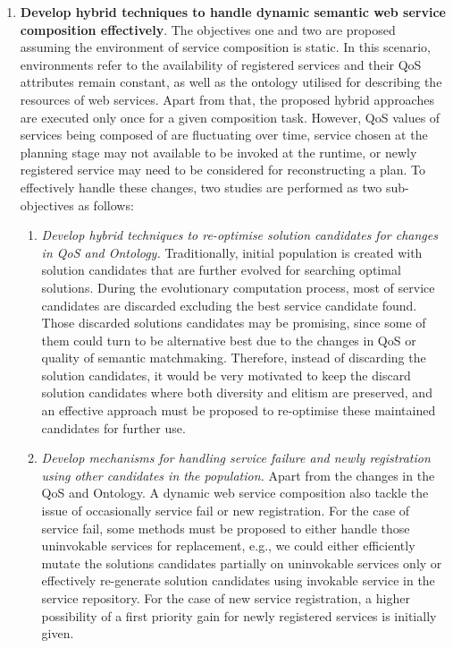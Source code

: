 \begin{enumerate}
 \item \textbf{Develop hybrid techniques to handle dynamic semantic web service composition effectively}. The objectives one and two are proposed assuming the environment of service composition is static. In this scenario, environments refer to the availability of registered services and their QoS attributes remain constant, as well as the ontology utilised for describing the resources of web services. Apart from that,  the proposed hybrid approaches are executed only once for a given composition task. However, QoS values of services being composed of are fluctuating over time, service chosen at the planning stage may not available to be invoked at the runtime, or newly registered service may need to be considered for reconstructing a plan. To effectively handle these changes, two studies are performed as two sub-objectives as follows:

  \begin{enumerate}
 \item \emph{Develop hybrid techniques to re-optimise solution candidates for changes in QoS and Ontology.} Traditionally, initial population is created with solution candidates that are further evolved for searching optimal solutions. During the evolutionary computation process, most of service candidates are discarded excluding the best service candidate found. Those discarded solutions candidates may be promising, since some of them could turn to be alternative best due to the changes in QoS or quality of semantic matchmaking. Therefore, instead of discarding the solution candidates, it would be very motivated to keep the discard solution candidates where both diversity and elitism are preserved, and an effective approach must be proposed to re-optimise these maintained candidates for further use.
 
 
 
 \item \emph{Develop mechanisms for handling service failure and newly registration using other candidates in the population.} Apart from the changes in the QoS and Ontology. A dynamic web service composition also tackle the issue of occasionally service fail or new registration. For the case of service fail, some methods must be proposed to either handle those uninvokable services for replacement, e.g., we could either efficiently mutate the solutions candidates partially on uninvokable services only or effectively re-generate solution candidates using invokable service in the service repository. For the case of new service registration, a higher possibility of a first priority gain for newly registered services is initially given.
 

\end{enumerate}
\end{enumerate}
